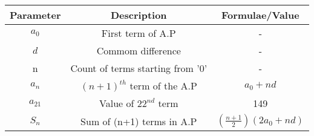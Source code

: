 \renewcommand{\arraystretch}{2}
\begin{tabular}{|c|c|c|}
\hline 
\setlength{\tabcolsep}{1pt}
\textbf{Parameter}  &\textbf{Description} &\textbf{Formulae/Value} \\
\hline
$a_0$ & First term of A.P & - \\
\hline
\textbf{$d$} & Commom difference & - \\
\hline
n & Count of terms starting from '0' & - \\
\hline
$a_n$ & $(n+1)^{th}$ term of the A.P & $a_0 + nd$ \\
\hline
$a_{21}$ & Value of $22^{nd}$ term & 149 \\

\hline
$S_n$ & Sum of (n+1) terms in A.P & $\left(\frac{n+1}{2}\right) (2a_0+nd)$ \\
\hline
\end{tabular}
